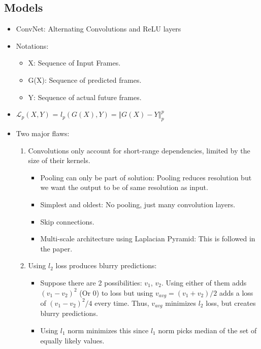 \documentclass{article}
\begin{document}
    \subsection{Models}\label{subsec:Deep_Multi_Scale_Video_Prediction_Beyond_Mean_Square_Error:models}
    \begin{itemize}
        \item ConvNet: Alternating Convolutions and ReLU layers
        \item Notations:
        \begin{itemize}
            \item X: Sequence of Input Frames.
            \item G(X): Sequence of predicted frames.
            \item Y: Sequence of actual future frames.
        \end{itemize}
        \item $\mathscr{L}_p(X,Y)$ = $l_p(G(X),Y) = \left\Vert G(X) - Y\right\Vert_p^p$
        \item Two major flaws:
        \begin{enumerate}
            \item Convolutions only account for short-range dependencies, limited by the size of their kernels.
            \begin{itemize}
                \item Pooling can only be part of solution: Pooling reduces resolution but we want the output to be of same resolution as input.
                \item Simplest and oldest: No pooling, just many convolution layers.
                \item Skip connections.
                \item Multi-scale architecture using Laplacian Pyramid: This is followed in the paper.
            \end{itemize}
            \item Using $l_2$ loss produces blurry predictions:
            \begin{itemize}
                \item Suppose there are 2 possibilities: $v_1$, $v_2$.
                Using either of them adds $(v_1-v_2)^2$ (Or 0) to loss but using $v_{avg}=(v_1+v_2)/2$ adds a loss of $(v_1-v_2)^2/4$ every time.
                Thus, $v_{avg}$ minimizes $l_2$ loss, but creates blurry predictions.
                \item Using $l_1$ norm minimizes this since $l_1$ norm picks median of the set of equally likely values.
            \end{itemize}
        \end{enumerate}
    \end{itemize}
\end{document}
